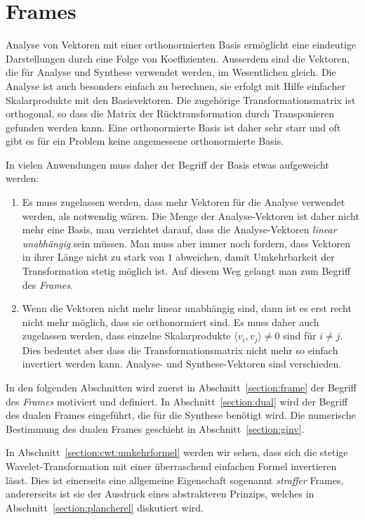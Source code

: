 %
%
%
\chapter{Frames
\label{chapter:frames}}
Analyse von Vektoren mit einer orthonormierten Basis ermöglicht eine
eindeutige Darstellungen durch eine Folge von Koeffizienten. 
Ausserdem sind die Vektoren, die für Analyse und Synthese verwendet
werden, im Wesentlichen gleich.
Die Analyse ist auch besonders einfach zu berechnen,
sie erfolgt mit Hilfe einfacher Skalarprodukte mit den Basisvektoren.
Die zugehörige Transformationsmatrix ist orthogonal, so dass die
Matrix der Rücktransformation durch Transponieren gefunden werden kann.
Eine orthonormierte Basis ist daher sehr starr und oft gibt es für ein
Problem keine angemessene orthonormierte Basis.

In vielen Anwendungen muss daher der Begriff der Basis etwas aufgeweicht
werden:
\begin{enumerate}
\item
Es muss zugelassen werden, dass mehr Vektoren für die Analyse verwendet
werden, als notwendig wären.
Die Menge der Analyse-Vektoren ist daher nicht mehr eine Basis, man
verzichtet darauf, dass die Analyse-Vektoren {\em linear unabhängig} sein
müssen.
Man muss aber immer noch fordern, dass Vektoren in ihrer Länge nicht
zu stark von $1$ abweichen,
damit Umkehrbarkeit der Transformation stetig möglich ist.
Auf diesem Weg gelangt man zum Begriff des {\em Frames}.
\item
Wenn die Vektoren nicht mehr linear unabhängig sind, dann ist es erst
recht nicht mehr möglich, dass sie orthonormiert sind.
Es muss daher auch zugelassen werden, dass einzelne Skalarprodukte 
$\langle v_i,v_j\rangle\ne 0$ sind für $i\ne j$.
Dies bedeutet aber dass die Transformationsmatrix nicht mehr so einfach
invertiert werden kann.
Analyse- und Synthese-Vektoren sind verschieden.
\end{enumerate}
In den folgenden Abschnitten wird zuerst in Abschnitt~\ref{section:frame}
der Begriff des {\em Frames} motiviert und definiert.
%
In Abschnitt~\ref{section:dual} wird der Begriff des dualen Frames
eingeführt, die für die Synthese benötigt wird.
Die numerische Bestimmung des dualen Frames geschieht in
Abschnitt~\ref{section:ginv}.

In Abschnitt~\ref{section:cwt:umkehrformel} werden wir sehen, dass sich
%
die stetige Wavelet-Transformation mit einer überraschend einfachen
Formel invertieren lässt.
Dies ist einerseits eine allgemeine Eigenschaft sogenannt {\em straffer}
Frames, andererseits ist sie der Ausdruck eines abstrakteren Prinzips,
welches in Abschnitt~\ref{section:plancherel} diskutiert wird.


